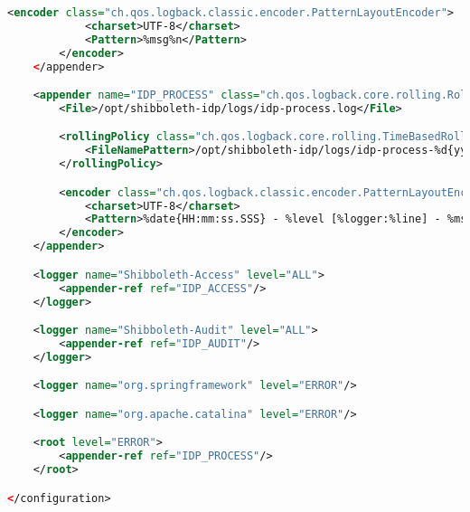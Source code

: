 \begin{lstlisting}[language=xml]
        <encoder class="ch.qos.logback.classic.encoder.PatternLayoutEncoder">
            <charset>UTF-8</charset>
            <Pattern>%msg%n</Pattern>
        </encoder>
    </appender>

    <appender name="IDP_PROCESS" class="ch.qos.logback.core.rolling.RollingFileAppender">
        <File>/opt/shibboleth-idp/logs/idp-process.log</File>

        <rollingPolicy class="ch.qos.logback.core.rolling.TimeBasedRollingPolicy">
            <FileNamePattern>/opt/shibboleth-idp/logs/idp-process-%d{yyyy-MM-dd}.log</FileNamePattern>
        </rollingPolicy>

        <encoder class="ch.qos.logback.classic.encoder.PatternLayoutEncoder">
            <charset>UTF-8</charset>
            <Pattern>%date{HH:mm:ss.SSS} - %level [%logger:%line] - %msg%n</Pattern>
        </encoder>
    </appender>

    <logger name="Shibboleth-Access" level="ALL">
        <appender-ref ref="IDP_ACCESS"/>
    </logger>

    <logger name="Shibboleth-Audit" level="ALL">
        <appender-ref ref="IDP_AUDIT"/>
    </logger>

    <logger name="org.springframework" level="ERROR"/>

    <logger name="org.apache.catalina" level="ERROR"/>

    <root level="ERROR">
        <appender-ref ref="IDP_PROCESS"/>
    </root>

</configuration>
\end{lstlisting}

